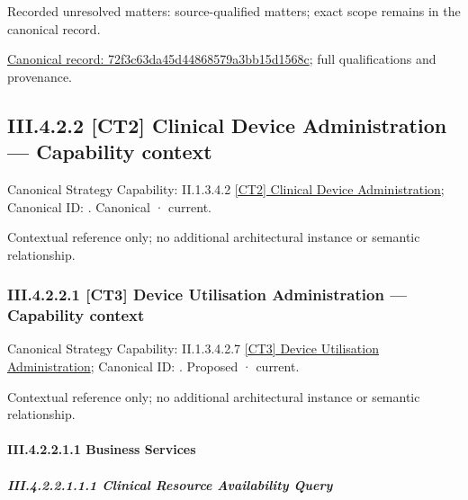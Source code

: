 {\small Recorded unresolved matters: source-qualified matters; exact scope remains in the canonical record.}\par
{\footnotesize \href{../../../../../../../continuum/business/business-process/72f3c63da45d44868579a3bb15d1568c.md}{Canonical record: 72f3c63da45d44868579a3bb15d1568c}; full qualifications and provenance.}\par
\subsection*{III.4.2.2 [CT2] Clinical Device Administration — Capability context}
\label{navigation:III.4.2.2}

{\small Canonical Strategy Capability: II.1.3.4.2 \hyperref[element:31bcd6fda0d14cc8b992cdca39a3cbed]{[CT2] Clinical Device Administration}; Canonical ID: \texttt{}. Canonical · current.}\par
Contextual reference only; no additional architectural instance or semantic relationship.\par
\subsubsection*{III.4.2.2.1 [CT3] Device Utilisation Administration — Capability context}
\label{navigation:III.4.2.2.1}

{\small Canonical Strategy Capability: II.1.3.4.2.7 \hyperref[element:1a3732b5911c45b3aece38b2db2d0f15]{[CT3] Device Utilisation Administration}; Canonical ID: \texttt{}. Proposed · current.}\par
Contextual reference only; no additional architectural instance or semantic relationship.\par
\paragraph*{III.4.2.2.1.1 Business Services}
\label{navigation:III.4.2.2.1.1}

\subparagraph*{III.4.2.2.1.1.1 Clinical Resource Availability Query}
\label{navigation:III.4.2.2.1.1.1}

